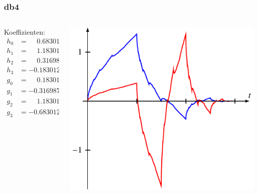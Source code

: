 \begin{frame}
\frametitle{db4}
\begin{columns}[T]
\begin{column}{2.5cm}
Koeffizienten:
\[
\begin{aligned}
h_0&=\phantom{-}0.6830127\\
h_1&=\phantom{-}1.1830127\\
h_2&=\phantom{-}0.3169873\\
h_3&=-0.1830127\\[10pt]
g_0&=\phantom{-}0.1830127\\
g_1&=-0.3169873\\
g_2&=\phantom{-}1.1830127\\
g_3&=-0.6830127
\end{aligned}
\]
\end{column}
\begin{column}{9.5cm}
\includegraphics{../../buch/chapters/7-algo/images/db2.pdf}
\end{column}
\end{columns}
\end{frame}

